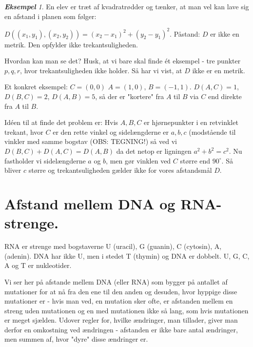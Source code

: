 \documentclass[a4paper, 12pt]{article}
\theoremstyle{remark}
\newtheorem{Eksempel}{\textbf{Eksempel}}
\begin{document}
\begin{Eksempel} En elev er træt af kvadratrødder og tænker, at man vel kan lave sig en afstand i planen som følger:

 $D((x_1,y_1),(x_2,y_2))=(x_2-x_1)^2+(y_2-y_1)^2$. Påstand: $D$ er ikke en metrik. Den opfylder ikke trekantsuligheden.

Hvordan kan man se det? Husk, at vi bare skal finde ét eksempel - tre punkter $p,q,r$, hvor trekantsuligheden ikke holder. Så har vi vist, at $D$ ikke er en metrik. 



Et konkret eksempel: $C=(0,0)$ $A=(1,0)$, $B=(-1,1)$. $D(A,C)=1$, $D(B,C)=2$, $D(A,B)=5$, så der er "kortere" fra $A$ til $B$ via $C$ end direkte fra $A$ til $B$.

Idéen til at finde det problem er: Hvis $A,B,C$ er hjørnepunkter i en retvinklet trekant, hvor $C$ er den rette vinkel og sidelængderne er $a,b,c$ (modstående til vinkler med samme bogstav (OBS: TEGNING!)
så ved vi $D(B,C)+D(A,C)=D(A,B)$ da det netop er ligningen $a^2+b^2=c^2$. Nu fastholder vi sidelængderne $a$ og $b$, men gør vinklen ved $C$ større end $90^\circ$. Så bliver $c$ større og trekantsuligheden gælder ikke for vores afstandsmål $D$.
\end{Eksempel}
\section{ Afstand mellem DNA og RNA-strenge.} 
RNA er strenge med bogstaverne U (uracil), G (guanin), C (cytosin), A, (adenin). DNA har ikke U, men i stedet T (thymin) og DNA er dobbelt. U, G, C, A og T er nukleotider. 

Vi ser her på afstande mellem DNA (eller RNA) som bygger på antallet af mutationer for at nå fra den ene til den anden og desuden, hvor hyppige disse mutationer er - hvis man ved, en mutation sker ofte, er afstanden mellem en streng uden mutationen og en med mutationen ikke så lang, som hvis mutationen er meget sjælden. 
 Udover regler for, hvilke ændringer, man tillader, giver man derfor en omkostning ved ændringen - afstanden er ikke bare antal ændringer, men summen af, hvor "dyre" disse ændringer er.
\end{document}
